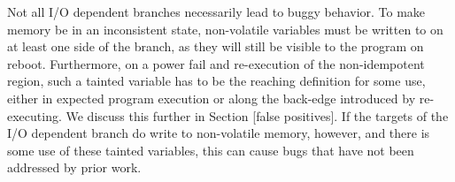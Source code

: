 Not all I/O dependent branches necessarily lead to buggy behavior. To make
memory be in an inconsistent state, non-volatile variables must be written to on
at least one side of the branch, as they will still be visible to the program on
reboot. Furthermore, on a power fail and re-execution of the non-idempotent
region, such a tainted variable has to be the reaching definition for some use,
either in expected program execution or along the back-edge introduced by
re-executing. We discuss this further in Section [false positives]. If the
targets of the I/O dependent branch do write to non-volatile memory, however,
and there is some use of these tainted variables, this can cause bugs that have
not been addressed by prior work.

	


